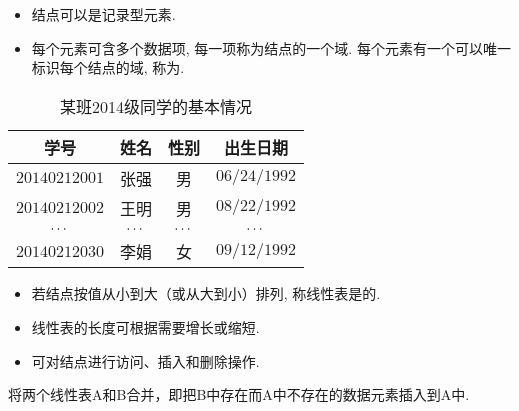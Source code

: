 \begin{frame}\ft{\subsecname}
\begin{itemize}
\item%
结点可以是记录型元素. 
\item[] 每个元素可含多个数据项, 每一项称为结点的一个域. 
每个元素有一个可以唯一标识每个结点的域, 称为. 
\end{itemize}

\begin{li}
\begin{table}
  \centering
  \caption{某班2014级同学的基本情况}
  \begin{tabular}{cccc}\hline
    学号&姓名&性别&出生日期\\\hline
    $20140212001$&张强&男&$06/24/1992$\\
    $20140212002$&王明&男&$08/22/1992$\\
    $\cdots$&$\cdots$&$\cdots$&$\cdots$\\
    $20140212030$&李娟&女&$09/12/1992$\\\hline
  \end{tabular}  
\end{table}
\end{li}

\end{frame}

\begin{frame}\ft{\subsecname}
\begin{itemize}
\item%
若结点按值从小到大（或从大到小）排列, 
称线性表是的. \\[0.2in]
\item%
线性表的长度可根据需要增长或缩短. \\[0.2in]
\item%
可对结点进行访问、插入和删除操作. 
\end{itemize}

\end{frame}


\begin{frame}[fragile]\ft{\subsecname}
  
\end{frame}



\begin{frame}\ft{\subsecname}
  \begin{li}
    将两个线性表A和B合并，即把B中存在而A中不存在的数据元素插入到A中.
  \end{li}
  \pause 
  
\end{frame}
